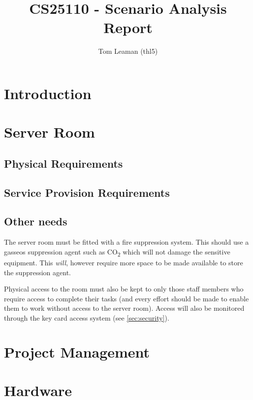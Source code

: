 \documentclass[a4paper, twoside]{article}
\title{CS25110 - Scenario Analysis Report}
\author{Tom Leaman (thl5)}
\begin{document}
\maketitle
\newpage

\section{Introduction}

\section{Server Room}
\subsection{Physical Requirements}

\subsection{Service Provision Requirements}

\subsection{Other needs}

The server room must be fitted with a fire suppression system. This should use a
gasseos suppression agent such as CO\textsubscript{2} which will not damage the
sensitive equipment. This \emph{will}, however require more space to be made
available to store the suppression agent.

Physical access to the room must also be kept to only those staff members who
require access to complete their tasks (and every effort should be made to
enable them to work without access to the server room). Access will also be
monitored through the key card access system (see \ref{sec:security}).

\section{Project Management}

\section{Hardware}
\end{document}
